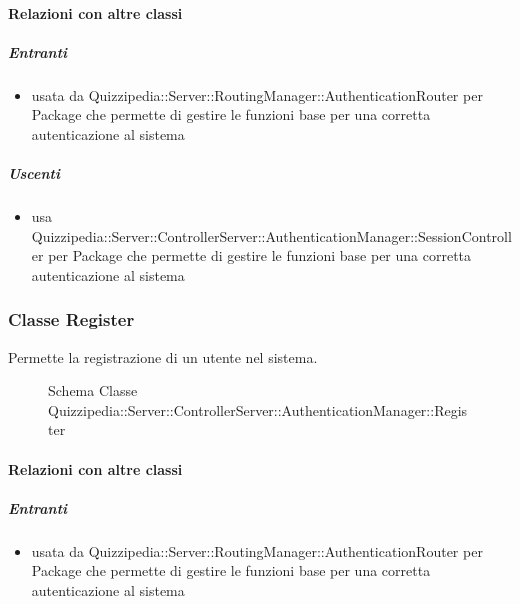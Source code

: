 \paragraph{Relazioni con altre classi}
\subparagraph{Entranti}
\begin{itemize}
\item usata da Quizzipedia::Server::RoutingManager::AuthenticationRouter per Package che permette di gestire le funzioni base per una corretta autenticazione al sistema
\end{itemize}
\subparagraph{Uscenti}
\begin{itemize}
\item usa Quizzipedia::Server::ControllerServer::AuthenticationManager::SessionController per Package che permette di gestire le funzioni base per una corretta autenticazione al sistema
\end{itemize}
\subsubsection{Classe Register}
Permette la registrazione di un utente nel sistema.
\begin{figure}[H]
\centering
\noindent{}
\caption[Schema Classe Register]{Schema Classe Quizzipedia::Server::ControllerServer::AuthenticationManager::Register}
\end{figure}
\paragraph{Relazioni con altre classi}
\subparagraph{Entranti}
\begin{itemize}
\item usata da Quizzipedia::Server::RoutingManager::AuthenticationRouter per Package che permette di gestire le funzioni base per una corretta autenticazione al sistema
\end{itemize}
